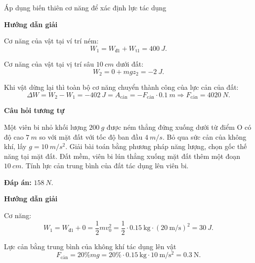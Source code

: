\begin{dang}{Áp dụng biến thiên cơ năng  để xác định lực tác dụng }
	
	{\begin{center}
			\textbf{Hướng dẫn giải}
		\end{center}
		
		Cơ năng của vật tại ví trí ném:
		$$W_1 = W_\text{đ1} + W_\text{t1} = \SI{400}{J}.$$
		
		Cơ năng của vật tại vị trí sâu $\SI{10}{cm}$ dưới đất:
		$$W_2 = 0 + mgz_2 = \SI{-2}{J}.$$
		
		Khi vật dừng lại thì toàn bộ cơ năng chuyển thành công của lực cản của đất:
		$$\Delta W = W_2 - W_1 = \SI{-402}{J}= A_\text{cản} = -F_\text{cản} \cdot \SI{0.1}{m} \Rightarrow F_\text{cản} = \SI{4020}{N}.$$
		
		\begin{center}
			\textbf{Câu hỏi tương tự}
		\end{center}
		
		Một viên bi nhỏ khối lượng $\SI{200}{g}$ được ném thẳng đứng xuống dưới từ điểm O có độ cao $\SI{7}{m}$ so với mặt đất với tốc độ ban đầu $\SI{4}{m/s}$. Bỏ qua sức cản của không khí, lấy $g=\SI{10}{m/s^2}$. Giải bài toán bằng phương pháp năng lượng, chọn gốc thế năng tại mặt đất. Đất mềm, viên bi lún thẳng xuống mặt đất thêm một đoạn $\SI{10}{cm}$. Tính lực cản trung bình của đất tác dụng lên viên bi.
		
		\textbf{Đáp án:} $\SI{158}{N}$.
	}
	{\begin{center}
			\textbf{Hướng dẫn giải}
		\end{center}
		
		Cơ năng:
		$$W_1 = W_\text{đ1} + 0 =\dfrac{1}{2}mv_0^2=\dfrac{1}{2}\cdot\SI{0.15}{\kilogram}\cdot(\SI{20}{\meter/\second})^2= \SI{30}{J}.$$
		
		Lực cản bằng trung bình của không khí tác dụng lên vật  $$F_\text{cản} = 20\%mg = 20\%\cdot\SI{0.15}{\kilogram}\cdot\SI{10}{\meter/\second^2}= \SI{0.3}{\newton}.$$
		
}
\end{dang}
